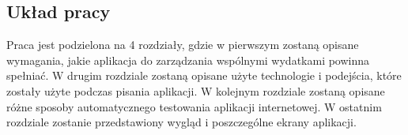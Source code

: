 \subsection{Układ pracy}
Praca jest podzielona na 4 rozdziały, gdzie w pierwszym zostaną opisane wymagania, jakie aplikacja do zarządzania wspólnymi wydatkami powinna spełniać. W drugim rozdziale zostaną opisane użyte technologie i podejścia, które zostały użyte podczas pisania aplikacji. W kolejnym rozdziale zostaną opisane różne sposoby automatycznego testowania aplikacji internetowej. W ostatnim rozdziale zostanie przedstawiony wygląd i poszczególne ekrany aplikacji.


